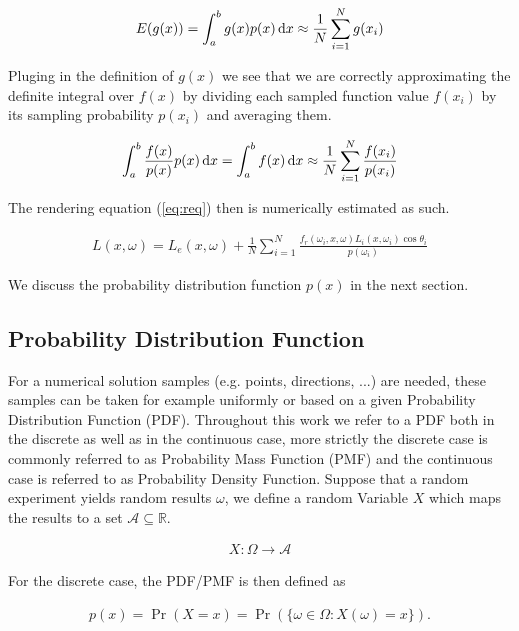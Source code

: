 \begin{align}
E(g(x)) = \int_a^b g(x)p(x)\mathop{}\!\mathrm{d} x \approx \frac{1}{N} \sum_{i=1}^{N} g(x_i) 
\end{align}

Pluging in the definition of $g(x)$ we see that we are correctly approximating the definite integral over $f(x)$ by dividing each sampled function value $f(x_i)$ by its sampling probability $p(x_i)$ and averaging them.

\begin{align}
\label{eq:mci}
\int_a^b \frac{f(x)}{p(x)}p(x)\mathop{}\!\mathrm{d} x = \int_a^b f(x) \mathop{}\!\mathrm{d} x \approx \frac{1}{N} \sum_{i=1}^{N} \frac{f(x_i)}{p(x_i)}
\end{align}


The rendering equation (\ref{eq:req}) then is numerically estimated as such.

\begin{align}
\label{eq:reqmc}
L(x, \omega) =  L_e(x, \omega) + \frac{1}{N} \sum_{i=1}^{N} \frac{f_r(\omega_i, x, \omega) L_i(x, \omega_i)\cos\theta_i}{p(\omega_i)}
\end{align}

We discuss the probability distribution function $p(x)$ in the next section. 

\subsection{Probability Distribution Function}
\label{sec:PDF}

For a numerical solution samples (e.g. points, directions, ...) are needed, these samples can be taken for example uniformly or based on a given Probability Distribution Function (PDF). Throughout this work we refer to a PDF both in the discrete as well as in the continuous case, more strictly the discrete case is commonly referred to as Probability Mass Function (PMF) and the continuous case is referred to as Probability Density Function. Suppose that a random experiment yields random results $\omega$, we define a random Variable $X$ which maps the results to a set $\mathcal{A} \subseteq \mathbb{R}$.

\begin{align}
X: \Omega \rightarrow \mathcal{A}
\end{align}

For the discrete case, the PDF/PMF is then defined as

\begin{align}
p(x) = \Pr(X = x) = \Pr( \{\omega \in \Omega : X(\omega) = x \} ).
\end{align}

